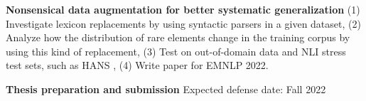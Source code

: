 \documentclass[12pt]{article}
\newcommand{\tabitem}{~~\llap{\textbullet}~~}
\begin{document}
\halfblankline

\noindent \textbf{Nonsensical data augmentation for better systematic generalization} (1) Investigate lexicon replacements by using syntactic parsers in a given dataset, (2) Analyze how the distribution of rare elements change in the training corpus by using this kind of replacement, (3) Test on out-of-domain data and NLI stress test sets, such as HANS \cite{mccoy2019}, (4) Write paper for EMNLP 2022.

\halfblankline

\noindent \textbf{Thesis preparation and submission} Expected defense date: Fall 2022




\end{document}

